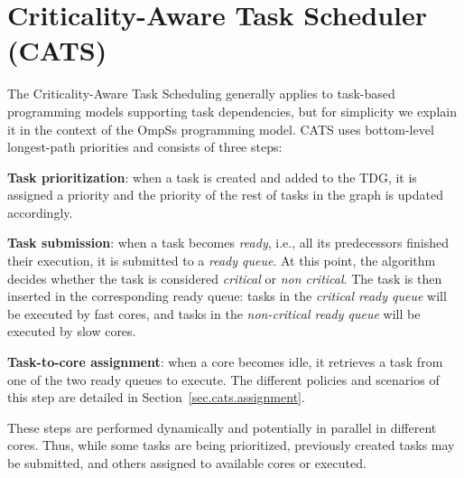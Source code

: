 
\section{Criticality-Aware Task Scheduler (CATS)}
\label{sec.scheduling.cats}
The Criticality-Aware Task Scheduling generally applies to task-based programming models supporting task dependencies, but for simplicity we explain it in the context of the OmpSs programming model.
CATS uses bottom-level longest-path priorities and consists of three steps:

\textbf{Task prioritization}: when a task is created and added to the TDG, it is assigned a priority and the priority of the rest of tasks in the graph is updated accordingly.

\textbf{Task submission}: when a task becomes \textit{ready}, i.e., all its predecessors finished their execution, it is submitted to a \textit{ready queue}. At this point, the algorithm decides whether the task is considered \textit{critical} or \textit{non critical}. The task is then inserted in the corresponding ready queue: tasks in the \textit{critical ready queue} will be executed by fast cores, and tasks in the \textit{non-critical ready queue} will be executed by slow cores.

\textbf{Task-to-core assignment}: when a core becomes idle, it retrieves a task from one of the two ready queues to execute. 
The different policies and scenarios of this step are detailed in Section~\ref{sec.cats.assignment}.


These steps are performed dynamically and potentially in parallel in different cores. Thus, while some tasks are being prioritized, previously created tasks may be submitted, and others assigned to available cores or executed.

